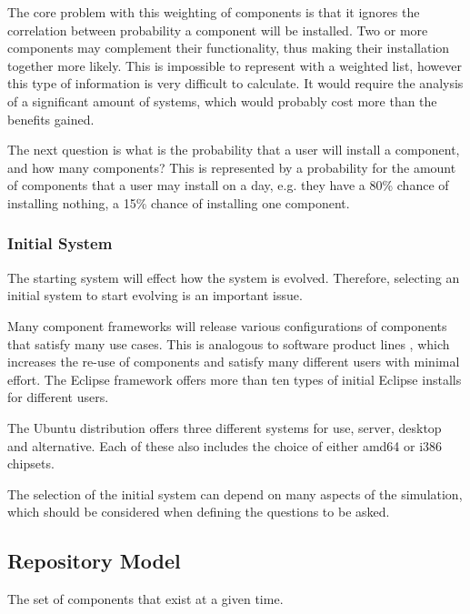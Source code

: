The core problem with this weighting of components is that it ignores the correlation between probability a component will be installed. 
Two or more components may complement their functionality, thus making their installation together more likely.
This is impossible to represent with a weighted list, however this type of information is very difficult to calculate.
It would require the analysis of a significant amount of systems, which would probably cost more than the benefits gained.

The next question is what is the probability that a user will install a component, and how many components?
This is represented by a probability for the amount of components that a user may install on a day,
e.g. they have a 80\% chance of installing nothing, a 15\% chance of installing one component.

\subsubsection{Initial System}
The starting system will effect how the system is evolved.
Therefore, selecting an initial system to start evolving is an important issue.

Many component frameworks will release various configurations of components that satisfy many use cases.
This is analogous to software product lines \citep{clements2001software}, which increases the re-use of components and satisfy many different users with minimal effort.
The Eclipse framework offers more than ten types of initial Eclipse installs for different users.

The Ubuntu distribution offers three different systems for use, server, desktop and alternative.
Each of these also includes the choice of either amd64 or i386 chipsets.

The selection of the initial system can depend on many aspects of the simulation, which should be considered when defining the questions to be asked.


\subsection{Repository Model}
The set of components that exist at a given time.

